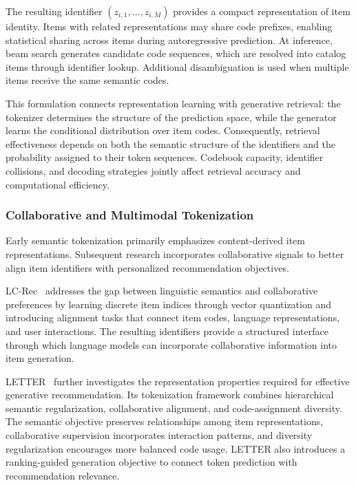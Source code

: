 \documentclass[sigconf,nonacm]{acmart}
\begin{document}
The resulting identifier
$(z_{i,1},\ldots,z_{i,M})$ provides a compact
representation of item identity. Items with related
representations may share code prefixes, enabling
statistical sharing across items during autoregressive
prediction. At inference, beam search generates
candidate code sequences, which are resolved into
catalog items through identifier lookup. Additional
disambiguation is used when multiple items receive
the same semantic codes.

This formulation connects representation learning
with generative retrieval: the tokenizer determines
the structure of the prediction space, while the
generator learns the conditional distribution over
item codes. Consequently, retrieval effectiveness
depends on both the semantic structure of the
identifiers and the probability assigned to their
token sequences. Codebook capacity, identifier
collisions, and decoding strategies jointly affect
retrieval accuracy and computational efficiency.

\subsubsection{Collaborative and Multimodal Tokenization}

Early semantic tokenization primarily emphasizes
content-derived item representations. Subsequent
research incorporates collaborative signals to
better align item identifiers with personalized
recommendation objectives.

LC-Rec~\cite{lcrec} addresses the gap between
linguistic semantics and collaborative preferences
by learning discrete item indices through vector
quantization and introducing alignment tasks that
connect item codes, language representations, and
user interactions. The resulting identifiers provide
a structured interface through which language models
can incorporate collaborative information into
item generation.

LETTER~\cite{letter} further investigates the
representation properties required for effective
generative recommendation. Its tokenization framework
combines hierarchical semantic regularization,
collaborative alignment, and code-assignment diversity.
The semantic objective preserves relationships among
item representations, collaborative supervision
incorporates interaction patterns, and diversity
regularization encourages more balanced code usage.
LETTER also introduces a ranking-guided generation
objective to connect token prediction with
recommendation relevance.
\end{document}
